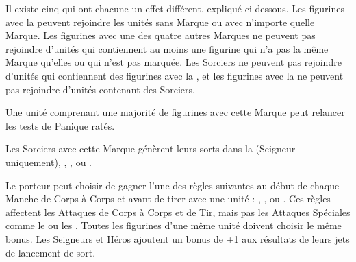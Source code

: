 \newcommand{\thumprule}{%
Choisissez une figurine en contact socle à socle avec le Géant dans l'unité sélectionnée. Cette figurine doit faire un test d'Initiative. Si elle échoue, la figurine subit 2D6 blessures avec la règle \armourpiercing{6}.
}

\newcommand{\smashrule}{%
Choisissez une figurine en contact socle à socle avec le Géant dans l'unité sélectionnée. Cette figurine subit une blessure avec la règle \armourpiercing{6}. Si la figurine n'a pas encore attaqué, elle ne peut plus le faire au cours de cette manche. Si la figurine a déjà réalisé ses attaques, elle ne pourra pas attaquer au cours du tour de  joueur à venir.
}



\newcommand{\QRSnote}{%
\noindent\refsymbol{} Un membre d'équipage de moins en tant que monture.
}












\startarmyspecialrules

\armyspecialruleentry{\marksofthedarkgods}

Il existe cinq \marksofthedarkgods{} qui ont chacune un effet différent, expliqué ci-dessous. Les figurines avec la \markoftruechaos{} peuvent rejoindre les unités sans Marque ou avec n'importe quelle Marque. Les figurines avec une des quatre autres Marques ne peuvent pas rejoindre d'unités qui contiennent au moins une figurine qui n'a pas la même Marque qu'elles ou qui n'est pas marquée. Les Sorciers ne peuvent pas rejoindre d'unités qui contiennent des figurines avec la \markofwrath{}, et les figurines avec la \markofwrath{} ne peuvent pas rejoindre d'unités contenant des Sorciers.

\spacebetweenmarks{}

\hfill\markstartsidetext{\markoftruechaos}
Une unité comprenant une majorité de figurines avec cette Marque peut relancer les tests de Panique ratés.

Les Sorciers avec cette Marque génèrent leurs sorts dans la \Pathof{} \heavens{} (Seigneur uniquement), \alchemy{}, \fire{}, \death{} ou \shadows{}.
\markclosesidetext{}

\spacebetweenmarks{}

\markstartsidetext{\markofchange}
Le porteur peut choisir de gagner l'une des règles suivantes au début de chaque Manche de Corps à Corps et avant de tirer avec une unité : \divineattacks{}, \flamingattacks{}, \magicalattacks{} ou \hellfire{}. Ces règles affectent les Attaques de Corps à Corps et de Tir, mais pas les Attaques Spéciales comme le \stomp{} ou les \impacthits{}. Toutes les figurines d'une même unité doivent choisir le même bonus. Les Seigneurs et Héros ajoutent un bonus de +1 aux résultats de leurs jets de lancement de sort.

